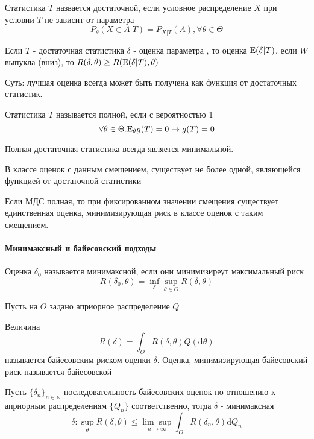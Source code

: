 \documentclass[main.tex]{subfiles}
\begin{document}
\begin{definition}
	Статистика $T$ назвается достаточной, если условное распределение $X$ при условии $T$ не зависит от параметра
	$$P_\theta(X\in A|T) = P_{X|T}(A),\forall \theta \in \Theta $$
\end{definition}

\begin{theorem}
	Если $T$ - достаточная статистика $\delta$ - оценка параметра \theta, то оценка $\mathrm{E}(\delta|T)$, если $W$ выпукла (вниз), то $R(\delta,\theta)\geq R(\mathrm{E}(\delta|T),\theta)$
\end{theorem}
Суть: лучшая оценка всегда может быть получена как функция от достаточных статистик.

\begin{definition}
	Статистика $T$ называется полной, если с вероятностью 1 $$\forall\theta\in\Theta.\mathrm{E}_\theta g(T)=0 \rightarrow g(T)=0$$
\end{definition}
Полная достаточная статистика всегда является минимальной.
\begin{theorem}
	В классе оценок с данным смещением, существует не более одной, являющейся функцией от достаточной статистики
\end{theorem}
Если МДС полная, то при фиксированном значении смещения существует единственная оценка, минимизирующая риск в классе оценок с таким смещением.

\paragraph{Минимаксный и байесовский подходы}
\begin{definition}
	Оценка $\delta_0$ называется минимаксной, если они минимизиреут максимальный риск $$R(\delta_0,\theta)=\inf_\delta \sup_{\theta\in\Theta} R(\delta,\theta)$$
\end{definition}

Пусть на $\Theta$ задано априорное распределение $Q$
\begin{definition}
	Величина $$R(\delta)=\int_\Theta R(\delta,\theta)Q(\mathrm{d}\theta) $$ называется байесовским риском оценки $\delta$. Оценка, минимизирующая байесовский риск называется байесовской
\end{definition}

\begin{theorem}[Лемана]
	Пусть $\{\delta_n\}_{n\in\mathbb{N}}$ последовательность байесовских оценок по отношению к априорным распределениям $\{Q_n\}$ соответственно, тогда $\delta$ - минимаксная
	$$\delta : \sup_\theta R(\delta,\theta) \leq \underset{n\rightarrow\infty}{\lim\sup}\int_\Theta R(\delta_n,\theta)\mathrm{d}Q_n$$
\end{theorem}
\end{document}

